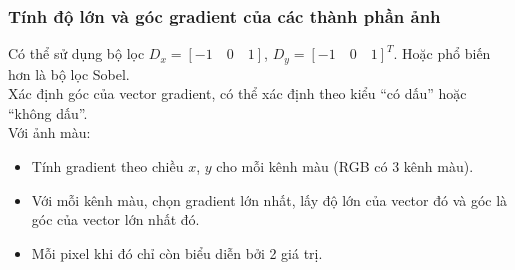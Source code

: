 \documentclass[../report.tex]{subfiles}
\begin{document}
\subsubsection{Tính độ lớn và góc gradient của các thành phần ảnh}
Có thể sử dụng bộ lọc $D_x = [-1 \quad 0 \quad 1]$, 
$D_y = [-1 \quad 0 \quad 1]^T$. Hoặc phổ biến hơn là bộ lọc Sobel. 
\\[3mm]
Xác định góc của vector gradient, có thể xác định 
theo kiểu “có dấu” hoặc “không dấu”. 
\\[3mm]
Với ảnh màu:
\begin{itemize}
\item Tính gradient theo chiều $x$, $y$ 
cho mỗi kênh màu (RGB có 3 kênh màu). 
\item Với mỗi kênh màu, chọn gradient lớn nhất, 
lấy độ lớn của vector đó và góc là góc của vector lớn nhất đó.  
\item Mỗi pixel khi đó chỉ còn biểu diễn bởi 2 giá trị.
\end{itemize}
\end{document}
